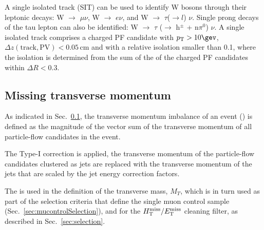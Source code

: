 A single isolated track (SIT) can be used to identify W bosons through
their leptonic decays: W $\rightarrow$ $\mu \nu$, W $\rightarrow$
$e\nu$, and W $\rightarrow$ $\tau$($\rightarrow l$) $\nu$.  Single
prong decays of the tau lepton can also be identified: W $\rightarrow$
$\tau$ ($\rightarrow$ h$^{\pm}$ + n$\pi^{0}$) $\nu$.  A single
isolated track comprises a charged PF candidate with $\Pt > 10 \gev$,
$\Delta z(\mathrm{track}, \mathrm{PV}) < 0.05 \, \mathrm{cm}$ and with
a relative isolation smaller than 0.1, where the isolation is
determined from the sum of the \Pt of the charged PF candidates within
$\Delta R < 0.3$.

\subsection{Missing transverse momentum}

As indicated in Sec.~\ref{}, the transverse momentum imbalance of an
event (\met) is defined as the magnitude of the vector sum of the
transverse momentum of all particle-flow candidates in the event.

The Type-I \met correction \cite{Khachatryan:2014gga} is applied, \ie
the transverse momentum of the particle-flow candidates clustered as
jets are replaced with the transverse momentum of the jets that are
scaled by the jet energy correction factors.

The \met is used in the definition of the transverse mass, $M_{T}$,
which is in turn used as part of the selection criteria that define
the single muon control sample (Sec.~\ref{sec:mucontrolSelection}),
and for the $\mbox{$\mbox{$H_{\rm T}^{\rm miss}$} / \mbox{$E_\text{T}^{\rm miss}$}$}$ cleaning filter, as described in
Sec.~\ref{sec:selection}.


